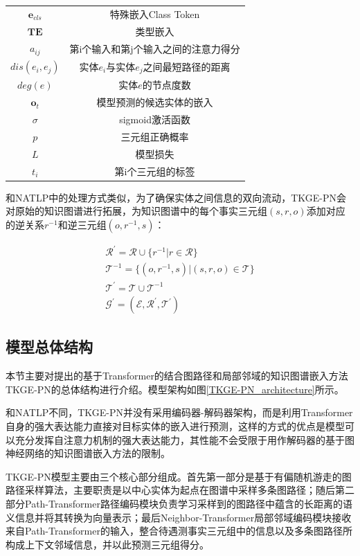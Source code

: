 \begin{longtable}[htbp]{cc}
  $\boldsymbol{e}_{cls}$ & 特殊嵌入Class Token\\
  $\mathbf{TE}$ & 类型嵌入\\
  $a_{ij}$ & 第i个输入和第j个输入之间的注意力得分\\
  $dis(e_i,e_j)$ & 实体$e_i$与实体$e_j$之间最短路径的距离\\
  $deg(e)$ & 实体$e$的节点度数\\
  $\boldsymbol{o}_t$ & 模型预测的候选实体的嵌入\\
  $\sigma $ & sigmoid激活函数\\
  $p$ & 三元组正确概率\\
  $L$ & 模型损失\\
  $t_i$ & 第i个三元组的标签\\

\end{longtable}

和NATLP中的处理方式类似，为了确保实体之间信息的双向流动，TKGE-PN会对原始的知识图谱进行拓展，为知识图谱中的每个事实三元组$(s,r,o)$添加对应的逆关系$r^{-1}$和逆三元组$(o,r^{-1},s)$：

\begin{gather}
    \mathcal{R}^{\prime}=\mathcal{R}\cup\{ r^{-1} | r\in \mathcal{R}\}\\
    \mathcal{T}^{-1}= \{ (o,r^{-1},s)| (s,r,o)\in \mathcal{T}\}\\
    \mathcal{T}^{\prime} = \mathcal{T}\cup\mathcal{T}^{-1}\\
    \mathcal{G}^\prime = (\mathcal{E}, \mathcal{R}^\prime, \mathcal{T}^\prime)
\end{gather}

\subsection{模型总体结构}

本节主要对提出的基于Transformer的结合图路径和局部邻域的知识图谱嵌入方法TKGE-PN的总体结构进行介绍。模型架构如图\ref{TKGE-PN_architecture}所示。



和NATLP不同，TKGE-PN并没有采用编码器-解码器架构，而是利用Transformer自身的强大表达能力直接对目标实体的嵌入进行预测，这样的方式的优点是模型可以充分发挥自注意力机制的强大表达能力，其性能不会受限于用作解码器的基于图神经网络的知识图谱嵌入方法的限制。



TKGE-PN模型主要由三个核心部分组成。首先第一部分是基于有偏随机游走的图路径采样算法，主要职责是以中心实体为起点在图谱中采样多条图路径；随后第二部分Path-Transformer路径编码模块负责学习采样到的图路径中蕴含的长距离的语义信息并将其转换为向量表示；最后Neighbor-Transformer局部邻域编码模块接收来自Path-Transformer的输入，整合待遇测事实三元组中的信息以及多条图路径所构成上下文邻域信息，并以此预测三元组得分。


